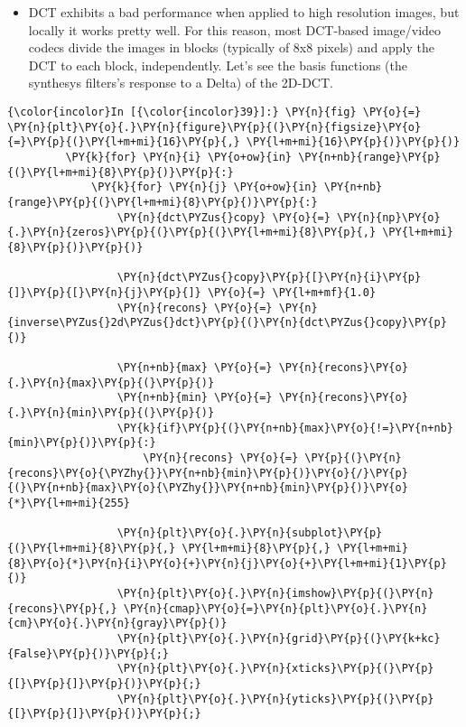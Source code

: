 \begin{itemize}
\tightlist
\item
  DCT exhibits a bad performance when applied to high resolution images,
  but locally it works pretty well. For this reason, most DCT-based
  image/video codecs divide the images in blocks (typically of 8x8
  pixels) and apply the DCT to each block, independently. Let's see the
  basis functions (the synthesys filters's response to a Delta) of the
  2D-DCT.
\end{itemize}

    \begin{Verbatim}[commandchars=\\\{\}]
{\color{incolor}In [{\color{incolor}39}]:} \PY{n}{fig} \PY{o}{=} \PY{n}{plt}\PY{o}{.}\PY{n}{figure}\PY{p}{(}\PY{n}{figsize}\PY{o}{=}\PY{p}{(}\PY{l+m+mi}{16}\PY{p}{,} \PY{l+m+mi}{16}\PY{p}{)}\PY{p}{)}
         \PY{k}{for} \PY{n}{i} \PY{o+ow}{in} \PY{n+nb}{range}\PY{p}{(}\PY{l+m+mi}{8}\PY{p}{)}\PY{p}{:}
             \PY{k}{for} \PY{n}{j} \PY{o+ow}{in} \PY{n+nb}{range}\PY{p}{(}\PY{l+m+mi}{8}\PY{p}{)}\PY{p}{:}
                 \PY{n}{dct\PYZus{}copy} \PY{o}{=} \PY{n}{np}\PY{o}{.}\PY{n}{zeros}\PY{p}{(}\PY{p}{(}\PY{l+m+mi}{8}\PY{p}{,} \PY{l+m+mi}{8}\PY{p}{)}\PY{p}{)}
         
                 \PY{n}{dct\PYZus{}copy}\PY{p}{[}\PY{n}{i}\PY{p}{]}\PY{p}{[}\PY{n}{j}\PY{p}{]} \PY{o}{=} \PY{l+m+mf}{1.0}
                 \PY{n}{recons} \PY{o}{=} \PY{n}{inverse\PYZus{}2d\PYZus{}dct}\PY{p}{(}\PY{n}{dct\PYZus{}copy}\PY{p}{)}
                 
                 \PY{n+nb}{max} \PY{o}{=} \PY{n}{recons}\PY{o}{.}\PY{n}{max}\PY{p}{(}\PY{p}{)}
                 \PY{n+nb}{min} \PY{o}{=} \PY{n}{recons}\PY{o}{.}\PY{n}{min}\PY{p}{(}\PY{p}{)}
                 \PY{k}{if}\PY{p}{(}\PY{n+nb}{max}\PY{o}{!=}\PY{n+nb}{min}\PY{p}{)}\PY{p}{:}
                     \PY{n}{recons} \PY{o}{=} \PY{p}{(}\PY{n}{recons}\PY{o}{\PYZhy{}}\PY{n+nb}{min}\PY{p}{)}\PY{o}{/}\PY{p}{(}\PY{n+nb}{max}\PY{o}{\PYZhy{}}\PY{n+nb}{min}\PY{p}{)}\PY{o}{*}\PY{l+m+mi}{255}
         
                 \PY{n}{plt}\PY{o}{.}\PY{n}{subplot}\PY{p}{(}\PY{l+m+mi}{8}\PY{p}{,} \PY{l+m+mi}{8}\PY{p}{,} \PY{l+m+mi}{8}\PY{o}{*}\PY{n}{i}\PY{o}{+}\PY{n}{j}\PY{o}{+}\PY{l+m+mi}{1}\PY{p}{)}
                 \PY{n}{plt}\PY{o}{.}\PY{n}{imshow}\PY{p}{(}\PY{n}{recons}\PY{p}{,} \PY{n}{cmap}\PY{o}{=}\PY{n}{plt}\PY{o}{.}\PY{n}{cm}\PY{o}{.}\PY{n}{gray}\PY{p}{)}
                 \PY{n}{plt}\PY{o}{.}\PY{n}{grid}\PY{p}{(}\PY{k+kc}{False}\PY{p}{)}\PY{p}{;}
                 \PY{n}{plt}\PY{o}{.}\PY{n}{xticks}\PY{p}{(}\PY{p}{[}\PY{p}{]}\PY{p}{)}\PY{p}{;}
                 \PY{n}{plt}\PY{o}{.}\PY{n}{yticks}\PY{p}{(}\PY{p}{[}\PY{p}{]}\PY{p}{)}\PY{p}{;}
\end{Verbatim}


